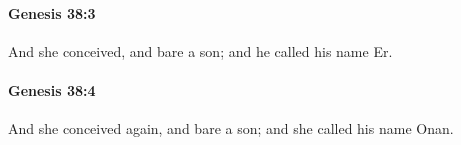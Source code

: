 		\paragraph{Genesis 38:3} %
			\label{GENESIS-38-3}

			And she conceived, and bare a son; and he called his name Er.


		\paragraph{Genesis 38:4} %
			\label{GENESIS-38-4}

			And she conceived again, and bare a son; and she called his name Onan.


